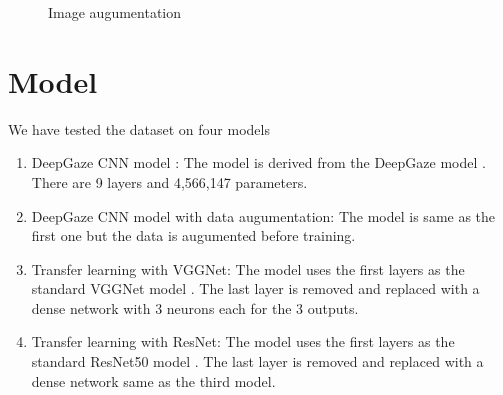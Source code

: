 \documentclass[a4paper, 12pt, oneside, BCOR1cm,toc=chapterentrywithdots]{scrbook}
\begin{document}
\begin{figure}[h]
\caption{Image augumentation}
\end{figure}



\section{Model}

We have tested the dataset on four models

\begin{enumerate}
	\item DeepGaze CNN model : The model is derived from the DeepGaze model \cite{}. There are 9 layers and 4,566,147 parameters. 
	\item DeepGaze CNN model with data augumentation: The model is same as the first one but the data is augumented before training. 
	\item Transfer learning with VGGNet: The model uses the first layers as the standard VGGNet model \cite{}. The last layer is removed and replaced with a dense network with 3 neurons each for the 3 outputs.
	\item Transfer learning with ResNet: The model uses the first layers as the standard ResNet50 model \cite{}. The last layer is removed and replaced with a dense network same as the third model.
\end{enumerate}
\end{document}
